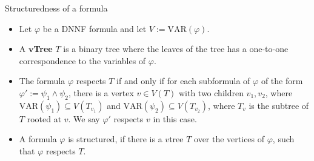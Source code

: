 \begin{frame}[t]{Structuredness of a formula}
	\begin{itemize}[<+->]
		\item Let $\varphi$ be a DNNF formula and let $V := \mathrm{VAR}(\varphi)$.
		\item A \textbf{$\mathbf{v}$Tree} $T$ is a binary tree where the leaves of the tree has a one-to-one correspondence to the variables of $\varphi$.
		\item The formula $\varphi$ respects $T$ if and only if for each subformula of  $\varphi$ of the form $\varphi' := \psi_1 \land \psi_2$, there is a vertex $v \in V(T)$ with two children $v_1, v_2$, where $\mathrm{VAR}(\psi_1)\subseteq V(T_{v_1})$ and $\mathrm{VAR}(\psi_2) \subseteq V(T_{v_2})$, where $T_v$ is the subtree of $T$ rooted at $v$. We say $\varphi'$ respects $v$ in this case.
		\item A formula $\varphi$ is structured, if there is a $v$tree $T$ over the vertices of $\varphi$, such that $\varphi$ respects $T$.
	\end{itemize}

\end{frame}

